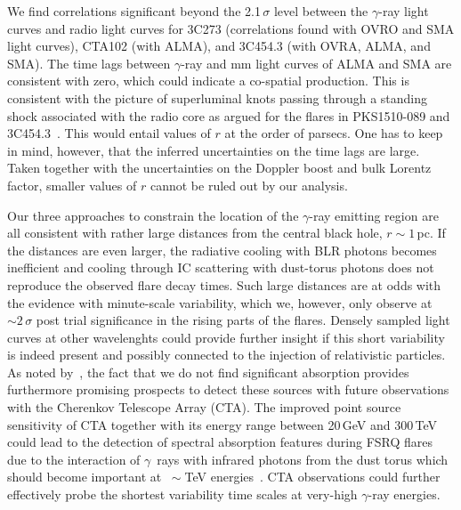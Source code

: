 \documentclass[twocolumn,linenumbers]{aastex62}
\newcommand{\Grays}{$\gamma$~rays\xspace}
\newcommand{\gray}{$\gamma$-ray\xspace}
\begin{document}
We find correlations significant beyond the 2.1\,$\sigma$ level between the \gray light curves and radio light curves for 3C273 (correlations found with OVRO and SMA light curves), CTA102 (with ALMA), and 3C454.3 (with OVRA, ALMA, and SMA). 
The time lags between \gray and mm light curves of ALMA and SMA are consistent with zero, which could indicate a co-spatial production. 
This is consistent with the picture of superluminal knots passing through a standing shock associated with the radio core as argued for the flares in PKS1510-089 and 3C454.3~\citep{2010ApJ...710L.126M,2012ApJ...758...72W,2013MNRAS.428.2418O}. 
This would entail values of $r$ at the order of parsecs. 
One has to keep in mind, however, that the inferred  uncertainties on the time lags are large. 
Taken together with the uncertainties on the Doppler boost and bulk Lorentz factor, 
smaller values of $r$ cannot be ruled out by our analysis. 

Our three approaches to constrain the location of the \gray emitting region are all consistent with rather large distances from the central black hole, $r \sim 1\,$pc. 
If the distances are even larger, the radiative cooling with BLR photons becomes inefficient and cooling through IC scattering with dust-torus photons does not reproduce the observed flare decay times. 
Such large distances are at odds with the evidence with minute-scale variability, which we, however, only observe at $\sim2\,\sigma$ post trial significance in the rising parts of the flares. 
Densely sampled light curves at other wavelenghts could provide further insight if this short variability is indeed present and possibly connected to the injection of relativistic particles.
As noted by~\citet{2018MNRAS.477.4749C}, the fact that we do not find significant absorption provides furthermore promising prospects to detect these sources with future observations with the Cherenkov Telescope Array (CTA). 
The improved point source sensitivity of CTA together with its energy range between 20\,GeV and 300\,TeV~\citep{2017arXiv170907997C} could lead to the detection of spectral absorption features during FSRQ flares due to the interaction of \Grays with infrared photons from the dust torus which should become important at $~\sim$TeV energies~\citep[see, e.g., Figure 14 in][]{finke2016}.
CTA observations could further effectively probe the shortest variability time scales at very-high \gray energies.
\end{document}
